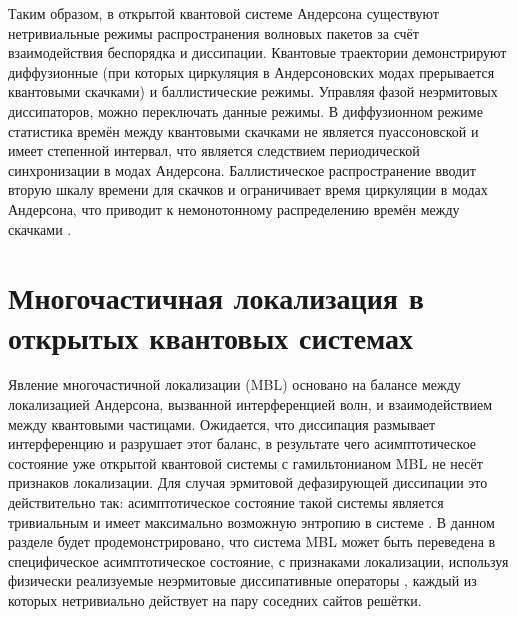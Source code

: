 Таким образом, в открытой квантовой системе Андерсона существуют нетривиальные режимы распространения волновых пакетов за счёт взаимодействия беспорядка и диссипации. Квантовые траектории демонстрируют диффузионные (при которых циркуляция в Андерсоновских модах прерывается квантовыми скачками) и баллистические режимы. Управляя фазой неэрмитовых диссипаторов, можно переключать данные режимы. В диффузионном режиме статистика времён между квантовыми скачками не является пуассоновской и имеет степенной интервал, что является следствием периодической синхронизации в модах Андерсона. Баллистическое распространение вводит вторую шкалу времени для скачков и ограничивает время циркуляции в модах Андерсона, что приводит к немонотонному распределению времён между скачками \cite{Yusipov2018}.

\section{Многочастичная локализация в открытых квантовых системах}\label{sec:ch2/prb_mbl}
Явление многочастичной локализации (MBL) основано на балансе между локализацией Андерсона, вызванной интерференцией волн, и взаимодействием между квантовыми частицами. Ожидается, что диссипация размывает интерференцию и разрушает этот баланс, в результате чего асимптотическое состояние уже открытой квантовой системы с гамильтонианом MBL не несёт признаков локализации. Для случая эрмитовой дефазирующей диссипации это действительно так: асимптотическое состояние такой системы является тривиальным и имеет максимально возможную энтропию в системе \cite{Levi2016, Fischer2016, Medvedyeva2016}. В данном разделе будет продемонстрировано, что система MBL может быть переведена в специфическое асимптотическое состояние, с признаками локализации, используя физически реализуемые неэрмитовые диссипативные операторы \cite{Diehl2008}, каждый из которых нетривиально действует на пару соседних сайтов решётки.

